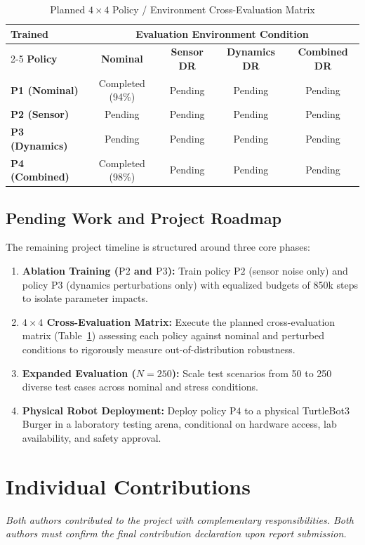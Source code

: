 \documentclass[conference]{IEEEtran}
\begin{document}
\begin{table}[t]
\caption{Planned $4 \times 4$ Policy / Environment Cross-Evaluation Matrix}
\centering
\begin{tabular}{lcccc}
\toprule
\textbf{Trained} & \multicolumn{4}{c}{\textbf{Evaluation Environment Condition}} \\
\cmidrule{2-5}
\textbf{Policy} & \textbf{Nominal} & \textbf{Sensor DR} & \textbf{Dynamics DR} & \textbf{Combined DR} \\
\midrule
\textbf{P1 (Nominal)} & Completed (94\%) & Pending & Pending & Pending \\
\textbf{P2 (Sensor)}  & Pending          & Pending & Pending & Pending \\
\textbf{P3 (Dynamics)}& Pending          & Pending & Pending & Pending \\
\textbf{P4 (Combined)}& Completed (98\%) & Pending & Pending & Pending \\
\bottomrule
\end{tabular}
\label{tab:matrix}
\end{table}

\subsection{Pending Work and Project Roadmap}
The remaining project timeline is structured around three core phases:
\begin{enumerate}
    \item \textbf{Ablation Training ($\text{P2}$ and $\text{P3}$):} Train policy $\text{P2}$ (sensor noise only) and policy $\text{P3}$ (dynamics perturbations only) with equalized budgets of 850k steps to isolate parameter impacts.
    \item \textbf{$4 \times 4$ Cross-Evaluation Matrix:} Execute the planned cross-evaluation matrix (Table~\ref{tab:matrix}) assessing each policy against nominal and perturbed conditions to rigorously measure out-of-distribution robustness.
    \item \textbf{Expanded Evaluation ($N=250$):} Scale test scenarios from 50 to 250 diverse test cases across nominal and stress conditions.
    \item \textbf{Physical Robot Deployment:} Deploy policy $\text{P4}$ to a physical TurtleBot3 Burger in a laboratory testing arena, conditional on hardware access, lab availability, and safety approval.
\end{enumerate}

\section{Individual Contributions}
\textit{Both authors contributed to the project with complementary responsibilities. Both authors must confirm the final contribution declaration upon report submission.}
\end{document}
